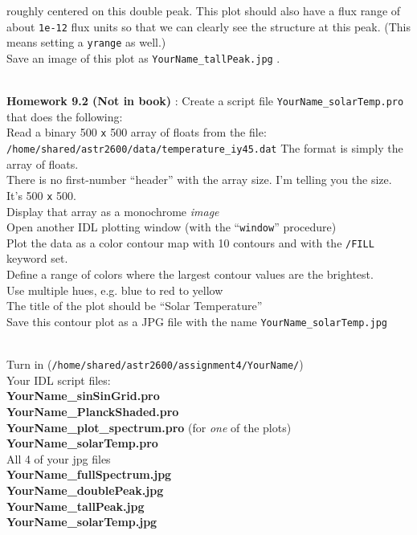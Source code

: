 \documentclass{article}
\begin{document}
\begin{spacing}{1.0}
  roughly centered on this double peak.   This plot should also have a flux
  range of about  \verb|1e-12|  flux units so that we can clearly see the
  structure at this peak.   (This means setting a  \verb|yrange|  as well.) \\ 
  Save an image of this plot as  \verb|YourName_tallPeak.jpg| . \\ 
  \par \\ 
  \textbf{Homework 9.2 (Not in book)} : Create a script file  \verb|YourName_solarTemp.pro|  that does the following: \\ 
  Read a binary 500 \verb|x| 500 array of floats from the file: \\ 
  \verb|/home/shared/astr2600/data/temperature_iy45.dat|
  The format is simply the array of floats.   \\ 
    There is no first-number “header” with the array size.   I’m telling you the size.   It’s 500  \verb|x|  500. \\ 
  Display that array as a monochrome  \emph{image} \\ 
  Open another IDL plotting window (with the “\verb|window|” procedure) \\ 
  Plot the data as a color contour map with 10 contours and with the  \verb|/FILL|  keyword set. \\ 
    Define a range of colors where the largest contour values are the brightest.    \\ 
    Use multiple hues, e.g. blue to red to yellow \\ 
  The title of the plot should be “Solar Temperature” \\ 
  Save this contour plot as a JPG file with the name  \verb|YourName_solarTemp.jpg| \\ 
  \par \\ 
  Turn in (\verb|/home/shared/astr2600/assignment4/YourName/|) \\ 
  Your IDL script files:   \\ 
  \textbf{YourName\_sinSinGrid.pro} \\ 
  \textbf{YourName\_PlanckShaded.pro} \\ 
  \textbf{YourName\_plot\_spectrum.pro}   (for  \emph{one}  of the plots) \\ 
  \textbf{YourName\_solarTemp.pro} \\ 
  All 4 of your jpg files \\ 
  \textbf{YourName\_fullSpectrum.jpg} \\ 
  \textbf{YourName\_doublePeak.jpg} \\ 
  \textbf{YourName\_tallPeak.jpg} \\ 
  \textbf{YourName\_solarTemp.jpg} \\ 
 
 
 \end{spacing}
 
\end{document}
